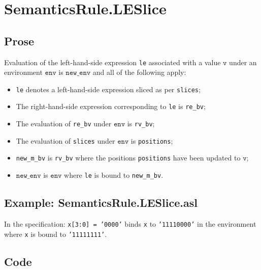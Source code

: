 \documentclass{book}
\newcommand\newenv[0]{\texttt{new\_env}}
\newcommand\env[0]{\texttt{env}}
\newcommand\vv[0]{\texttt{v}}
\begin{document}

\section{SemanticsRule.LESlice \label{sec:SemanticsRule.LESlice}}

    \subsection{Prose}
    Evaluation of the left-hand-side expression \texttt{le} associated with a
value $\vv$ under an environment $\env$ is $\newenv$ and all
of the following apply:
    \begin{itemize}
    \item \texttt{le} denotes a left-hand-side expression sliced as per \texttt{slices};
    \item The right-hand-side expression corresponding to \texttt{le} is \texttt{re\_bv};
    \item The evaluation of \texttt{re\_bv} under $\env$ is \texttt{rv\_bv};
    \item The evaluation of \texttt{slices} under $\env$ is \texttt{positions};
    \item \texttt{new\_m\_bv} is \texttt{rv\_bv} where the positions \texttt{positions} have been updated to $\vv$;
    \item $\newenv$ is $\env$ where \texttt{le} is bound to \texttt{new\_m\_bv}.
    \end{itemize}

   \subsection{Example: SemanticsRule.LESlice.asl}
   In the specification:
   \texttt{x[3:0] = '0000'} binds \texttt{x} to \texttt{'11110000'} in the environment where \texttt{x} is bound to \texttt{'11111111'}.

  \subsection{Code}
\end{document}
